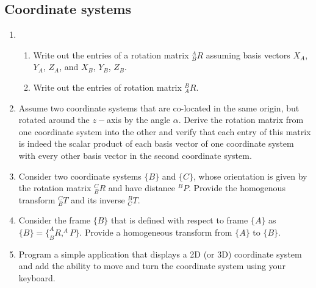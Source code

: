 \subsection*{Coordinate systems}
\begin{enumerate}
\item
\begin{enumerate}
 \item Write out the entries of a rotation matrix $^A_BR$ assuming basis vectors $X_A$, $Y_A$, $Z_A$, and $X_B$, $Y_B$, $Z_B$.
 \item Write out the entries of rotation matrix $^B_AR$.
 \end{enumerate}
\item Assume two coordinate systems that are co-located in the same origin, but rotated around the $z-$axis by the angle $\alpha$. Derive the rotation matrix from one coordinate system into the other and verify that each entry of this matrix is indeed the scalar product of each basis vector of one coordinate system with every other basis vector in the second coordinate system.
\item Consider two coordinate systems $\{B\}$ and $\{C\}$, whose orientation is given by the rotation matrix $^C_BR$ and have distance $^BP$. Provide the homogenous transform $^C_BT$ and its inverse $^B_CT$.
\item Consider the frame $\{B\}$ that is defined with respect to frame $\{A\}$ as $\{B\}=\{^A_BR, ^AP\}$. Provide a homogeneous transform from $\{A\}$ to $\{B\}$.
\item Program a simple application that displays a 2D (or 3D) coordinate system and add the ability to move and turn the coordinate system using your keyboard.
\end{enumerate}

